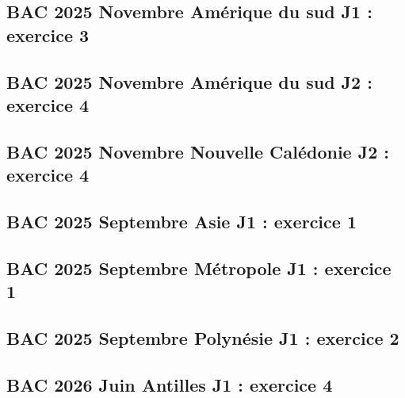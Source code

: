 \documentclass[lang=fr,edition=teacher,layout=sheet]{mxbook}
\begin{document}
\begingroup\endgroup
\par\bigskip
{}\subsection*{BAC 2025 Novembre Amérique du sud J1 : exercice 3}
\begingroup\endgroup
\par\bigskip
{}\subsection*{BAC 2025 Novembre Amérique du sud J2 : exercice 4}
\begingroup\endgroup
\par\bigskip
{}\subsection*{BAC 2025 Novembre Nouvelle Calédonie J2 : exercice 4}
\begingroup\endgroup
\par\bigskip
{}\subsection*{BAC 2025 Septembre Asie J1 : exercice 1}
\begingroup\endgroup
\par\bigskip
{}\subsection*{BAC 2025 Septembre Métropole J1 : exercice 1}
\begingroup\endgroup
\par\bigskip
{}\subsection*{BAC 2025 Septembre Polynésie J1 : exercice 2}
\begingroup\endgroup
\par\bigskip
{}\subsection*{BAC 2026 Juin Antilles J1 : exercice 4}
\end{document}
